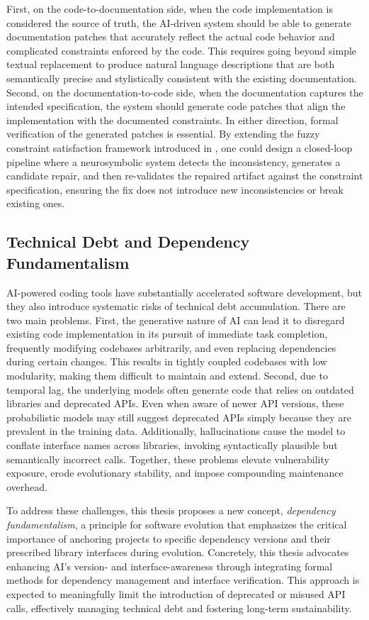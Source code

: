 First, on the code-to-documentation side, when the code implementation is considered the source of truth, the AI-driven system should be able to generate 
documentation patches that accurately reflect the actual code behavior and complicated constraints enforced by the code. This requires going beyond simple textual replacement to produce natural language descriptions that are both semantically precise and stylistically consistent with the existing documentation. Second, on the documentation-to-code side, when the documentation captures the intended specification, the system should generate code patches that align the implementation with the documented constraints. In either direction, formal verification of the generated patches is essential. By extending the fuzzy constraint satisfaction framework introduced in \toolchecker, one could design a closed-loop pipeline where a neurosymbolic system detects the inconsistency, generates a candidate repair, and then re-validates the repaired artifact against the constraint specification, ensuring the fix does not introduce new inconsistencies or break existing ones.


\subsection{Technical Debt and Dependency Fundamentalism}
AI-powered coding tools have substantially accelerated software development, but they also introduce systematic risks of technical debt accumulation. There are two main problems. First, the generative nature of AI can lead it to disregard existing code implementation in its pursuit of immediate task completion, frequently modifying codebases arbitrarily, and even replacing dependencies during certain changes. This results in tightly coupled codebases with low modularity, making them difficult to maintain and extend. Second, due to temporal lag, the underlying models often generate code that relies on outdated libraries and deprecated APIs. Even when aware of newer API versions, these probabilistic models may still suggest deprecated APIs simply because they are prevalent in the training data. Additionally, hallucinations cause the model to conflate interface names across libraries, invoking syntactically plausible but semantically incorrect calls. Together, these problems elevate vulnerability exposure, erode evolutionary stability, and impose compounding maintenance overhead.


To address these challenges, this thesis proposes a new concept, \textit{dependency fundamentalism}, a principle for software evolution that emphasizes the critical importance of anchoring projects to specific dependency versions and their prescribed library interfaces during evolution. Concretely, this thesis advocates enhancing AI's version- and interface-awareness through integrating formal methods for dependency management and interface verification. This approach is expected to meaningfully limit the introduction of deprecated or misused API calls, effectively managing technical debt and fostering long-term sustainability.

